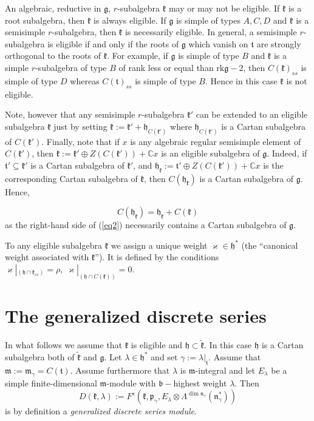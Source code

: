 \documentclass[default]{./styles/svmult}
\newcommand{\rk}{\mathrm{rk}}
\newcommand{\bb}{\mathfrak{b}}
\renewcommand{\gg}{\mathfrak{g}}
\newcommand{\hh}{\mathfrak{h}}
\newcommand{\kk}{\mathfrak{k}}
\newcommand{\mm}{\mathfrak{m}}
\newcommand{\nn}{\mathfrak{n}}
\newcommand{\pp}{\mathfrak{p}}
\renewcommand{\tt}{\mathfrak{t}}
\begin{document}
\vspace{0.3cm}

An algebraic, reductive in $\gg$, $r$-subalgebra $\kk$ may or may not be eligible. If $\kk$ is a root subalgebra, then $\kk$ is always eligible. If $\gg$ is simple of types $A,C,D$ and $\kk$ is a semisimple $r$-subalgebra, then $\kk$ is necessarily eligible. In general, a semisimple $r$-subalgebra is eligible if and only if the roots of $\gg$ which vanish on $\tt$ are strongly orthogonal to the roots of $\kk$. For example, if $\gg$ is simple of type $B$ and $\kk$ is a simple $r$-subalgebra of type $B$ of rank less or equal than $\rk\gg-2$, then $C(\kk)_{ss}$ is simple of type $D$ whereas $C(\tt)_{ss}$ is simple of type $B$. Hence in this case $\kk$ is not eligible.

Note, however that any semisimple $r$-subalgebra $\kk '$ can be extended to an eligible subalgebra $\kk$ just by setting $\kk:=\kk '+\hh_{C(\kk ')}$ where $\hh_{C(\kk ')}$ is a Cartan subalgebra of $C(\kk ')$. Finally, note that if $x$ is any algebraic regular semisimple element of $C(\kk ')$, then $\kk:= \kk'\oplus Z(C(\kk')) +\mathbb{C}x$ is an eligible subalgebra of $\gg$. Indeed, if $\tt '\subseteq\kk '$ is a Cartan subalgebra of $\kk '$, and $\hh_{\kk} := \tt' \oplus Z(C(\kk')) + \mathbb{C}x$ is the corresponding Cartan subalgebra of $\kk$, then $C(\hh_{\kk})$ is a Cartan subalgebra of $\gg$. Hence, 

\begin{equation}\label{eq2}
    C(\hh_{\kk})=\hh_{\kk}+C(\kk)
\end{equation}
as the right-hand side of (\ref{eq2}) necessarily contains a Cartan subalgebra of $\gg$.

To any eligible subalgebra $\kk$ we assign a unique weight $\varkappa\in\hh^*$ (the ``canonical weight associated with $\kk$''). It is defined by the conditions $\varkappa|_{(\hh\cap\kk_{ss})}=\rho,\; \varkappa|_{(\hh\cap C(\kk))}=0$.

\section{The generalized discrete series}\label{sect:5}

In what follows we assume that $\kk$ is eligible and $\hh \subset \tilde{\kk}$. In this case $\hh$ is a Cartan subalgebra both of $\tilde{\kk}$ and $\gg$. Let $\lambda\in\hh^*$ and set $\gamma := \lambda|_{\tt}$. Assume that $\mm:=\mm_{\gamma}=C(\tt)$. Assume furthermore that $\lambda$ is $\mm$-integral and let $E_\lambda$ be a simple finite-dimensional $\mm$-module with $\bb-$highest weight $\lambda$. Then $$D(\kk,\lambda):=F^s(\kk,\pp_{\gamma},E_\lambda\otimes\Lambda^{\dim\nn_{\gamma}}(\nn_{\gamma}^*))$$
is by definition a \textit{generalized discrete series module}.
\end{document}
